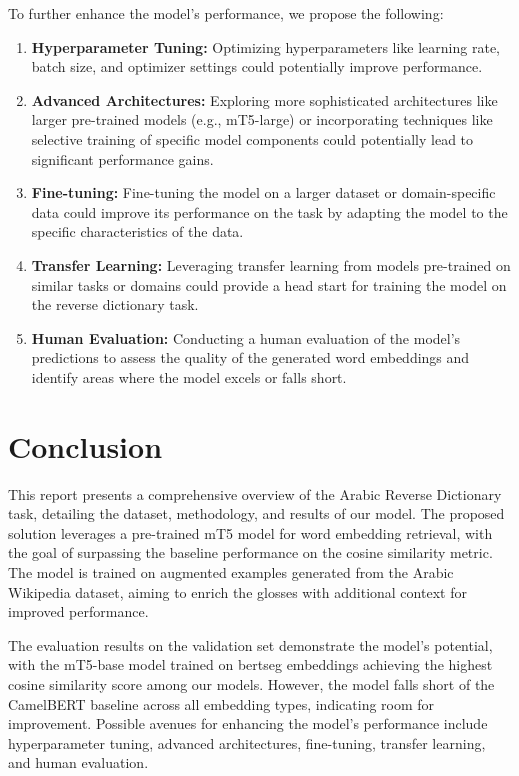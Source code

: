 \documentclass[12.5pt]{article}
\begin{document}
To further enhance the model's performance, we propose the following:
\begin{enumerate}
    \item \textbf{Hyperparameter Tuning:} Optimizing hyperparameters like learning rate, batch size, and optimizer settings could potentially improve performance.
    \item \textbf{Advanced Architectures:} Exploring more sophisticated architectures like larger pre-trained models (e.g., mT5-large) or incorporating techniques like selective training of specific model components could potentially lead to significant performance gains.
    \item \textbf{Fine-tuning:} Fine-tuning the model on a larger dataset or domain-specific data could improve its performance on the task by adapting the model to the specific characteristics of the data.
    \item \textbf{Transfer Learning:} Leveraging transfer learning from models pre-trained on similar tasks or domains could provide a head start for training the model on the reverse dictionary task.
    \item \textbf{Human Evaluation:} Conducting a human evaluation of the model's predictions to assess the quality of the generated word embeddings and identify areas where the model excels or falls short.
\end{enumerate} 

\newpage

\section{Conclusion}

This report presents a comprehensive overview of the Arabic Reverse Dictionary task, detailing the dataset, methodology, and results of our model. The proposed solution leverages a pre-trained mT5 model for word embedding retrieval, with the goal of surpassing the baseline performance on the cosine similarity metric. The model is trained on augmented examples generated from the Arabic Wikipedia dataset, aiming to enrich the glosses with additional context for improved performance.

The evaluation results on the validation set demonstrate the model's potential, with the mT5-base model trained on bertseg embeddings achieving the highest cosine similarity score among our models. However, the model falls short of the CamelBERT baseline across all embedding types, indicating room for improvement. Possible avenues for enhancing the model's performance include hyperparameter tuning, advanced architectures, fine-tuning, transfer learning, and human evaluation.
\end{document}
